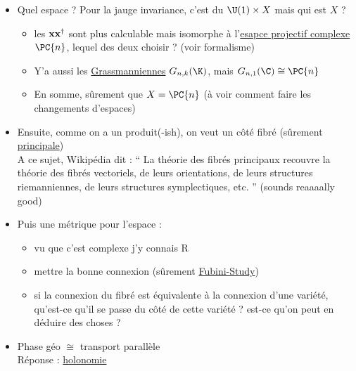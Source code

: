 \begin{itemize}
	\item Quel espace ? Pour la jauge invariance, c'est du $\U(1)\times X$ mais qui est $X$ ? 
	\begin{itemize}
		\item les $\bf{x}\bf{x}^\dagger$ sont plus calculable mais isomorphe à l'\href{https://en.wikipedia.org/wiki/Complex_projective_space#Differential_geometry}{esapce projectif complexe} $\PC{n}$, lequel des deux choisir ? (voir formalisme)
		
		\item Y'a aussi les \href{https://fr.wikipedia.org/wiki/Grassmannienne}{Grassmanniennes} $G_{n,k}(\K)$, mais $G_{n, 1}(\C)\cong \PC{n}$
		
		\item En somme, sûrement que $X=\PC{n}$ (à voir comment faire les changements d'espaces)
		
	\end{itemize}
	
	\item Ensuite, comme on a un produit(-ish), on veut un côté fibré (sûrement \href{https://fr.wikipedia.org/wiki/Fibr%C3%A9_principal}{principale}) \\
	A ce sujet, Wikipédia dit : `` La théorie des fibrés principaux recouvre la théorie des fibrés vectoriels, de leurs orientations, de leurs structures riemanniennes, de leurs structures symplectiques, etc. '' (sounds reaaaally good)
	
	\item Puis une métrique pour l'espace :
	\begin{itemize}
		
		\item vu que c'est complexe j'y connais R
		
		\item mettre la bonne connexion (sûrement \href{https://en.wikipedia.org/wiki/Fubini%E2%80%93Study_metric}{Fubini-Study})
		
		\item si la connexion du fibré est équivalente à la connexion d'une variété, qu'est-ce qu'il se passe du côté de cette variété ? est-ce qu'on peut en déduire des choses ?
	\end{itemize} 
	
	\item Phase géo $\cong$ transport parallèle
	\\ Réponse :
	\href{https://fr.wikipedia.org/wiki/Holonomie}{holonomie}
	

\end{itemize}
